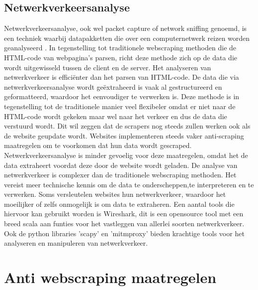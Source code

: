 \subsection{Netwerkverkeersanalyse}

Netwerkverkeersanalyse, ook wel packet capture of network sniffing genoemd, is een techniek waarbij datapakketten die over een computernetwerk reizen worden geanalyseerd \autocite{Chapple2018}.  In tegenstelling tot traditionele webscraping methoden die de HTML-code van webpagina’s parsen, richt deze methode zich op de data die wordt uitgewisseld tussen de client en de server. Het analyseren van netwerkverkeer is efficiënter dan het parsen van HTML-code.  De
data die via netwerkverkeersanalyse wordt geëxtraheerd is vaak al gestructureerd en geformatteerd, waardoor het eenvoudiger te verwerken is.
Deze methode is in tegenstelling tot de traditionele manier veel flexibeler omdat er niet naar de
HTML-code wordt gekeken maar wel naar het verkeer en dus de data die verstuurd wordt. Dit wil
zeggen dat de scrapers nog steeds zullen werken
ook als de website geupdate wordt. Websites implementeren steeds vaker anti-scraping maatregelen om te voorkomen dat hun data wordt gescraped. Netwerkverkeersanalyse is minder gevoelig voor deze maatregelen, omdat het de data
extraheert voordat deze door de website wordt
geladen. De analyse van netwerkverkeer is
complexer dan de traditionele webscraping methoden. Het vereist meer technische kennis om
de data te onderscheppen,te interpreteren en te
verwerken. Soms versleutelen websites hun netwerkverkeer, waardoor het moeilijker of zelfs onmogelijk is om data te extraheren. Een aantal tools die hiervoor kan gebruikt worden is Wireshark,
dit is een opensource tool met een breed scala
aan funties voor het vastleggen van allerlei soorten netwerkverkeer. Ook de python libraries ’scapy’
en ’mitmproxy’ bieden krachtige tools voor het
analyseren en manipuleren van netwerkverkeer.

\section{Anti webscraping maatregelen}
